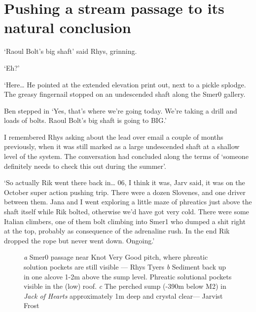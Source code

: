 \section{Pushing a stream passage to its natural conclusion}

‘Raoul Bolt’s big shaft’ said Rhys, grinning.

‘Eh?’

‘Here… He pointed at the extended elevation print out, next to a pickle splodge. The greasy fingernail stopped on an undescended shaft along the Smer0 gallery. 

Ben stepped in ‘Yes, that’s where we’re going today. We’re taking a drill and loads of bolts. Raoul Bolt’s big shaft is going to BIG.’

I remembered Rhys asking about the lead over email a couple of months previously, when it was still marked as a large undescended shaft at a shallow level of the system. The conversation had concluded along the terms of ‘someone definitely needs to check this out during the summer’.

‘So actually Rik went there back in… 06, I think it was, Jarv said, it was on the October super action pushing trip. There were a dozen Slovenes, and one driver between them. Jana and I went exploring a little maze of phreatics just above the shaft itself while Rik bolted, otherwise we’d have got very cold. There were some Italian climbers, one of them bolt climbing into Smer1 who dumped a shit right at the top, probably as consequence of the adrenaline rush. In the end Rik dropped the rope but never went down. Ongoing.’


\begin{figure*}[t!]
\checkoddpage \ifoddpage \forcerectofloat \else \forceversofloat \fi
\centering
\begin{subfigure}[t]{0.328\textwidth}
\centering
{}
 \caption{}\label{information}
\end{subfigure}
    \hfill
    \begin{subfigure}[t]{0.662\textwidth}
        \centering
        \caption{} \label{stretcher prepared}
    \end{subfigure}
    
    \vspace{0.3cm}
    \begin{subfigure}[t]{\textwidth}
    \centering
        \caption{} \label{stretcher moved}
    \end{subfigure}
    \caption{
    \emph{a} Smer0 passage near Knot Very Good pitch, where phreatic solution pockets are still visible --- Rhys Tyers
    \emph{b} Sediment back up in one alcove 1-2m above the sump level. Phreatic solutional pockets visible in the (low) roof.
    \emph{c} The perched sump (-390m below M2) in \emph{Jack of Hearts} approximately 1m deep and crystal clear--- Jarvist Frost}
\end{figure*}


